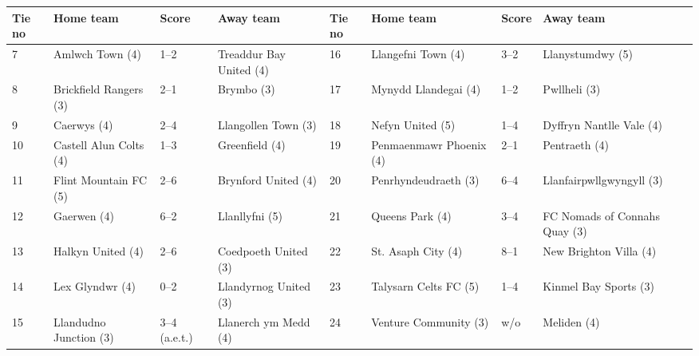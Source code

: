 \documentclass{article}
\begin{document}
\begin{tabular}{llllllll}
\toprule
Tie no & Home team & Score & Away team & Tie no & Home team & Score & Away team \\
\midrule
7 & Amlwch Town (4) & 1–2 & Treaddur Bay United (4) & 16 & Llangefni Town (4) & 3–2 & Llanystumdwy (5) \\
8 & Brickfield Rangers (3) & 2–1 & Brymbo (3) & 17 & Mynydd Llandegai (4) & 1–2 & Pwllheli (3) \\
9 & Caerwys (4) & 2–4 & Llangollen Town (3) & 18 & Nefyn United (5) & 1–4 & Dyffryn Nantlle Vale (4) \\
10 & Castell Alun Colts (4) & 1–3 & Greenfield (4) & 19 & Penmaenmawr Phoenix (4) & 2–1 & Pentraeth (4) \\
11 & Flint Mountain FC (5) & 2–6 & Brynford United (4) & 20 & Penrhyndeudraeth (3) & 6–4 & Llanfairpwllgwyngyll (3) \\
12 & Gaerwen (4) & 6–2 & Llanllyfni (5) & 21 & Queens Park (4) & 3–4 & FC Nomads of Connahs Quay (3) \\
13 & Halkyn United (4) & 2–6 & Coedpoeth United (3) & 22 & St. Asaph City (4) & 8–1 & New Brighton Villa (4) \\
14 & Lex Glyndwr (4) & 0–2 & Llandyrnog United (3) & 23 & Talysarn Celts FC (5) & 1–4 & Kinmel Bay Sports (3) \\
15 & Llandudno Junction (3) & 3–4 (a.e.t.) & Llanerch ym Medd (4) & 24 & Venture Community (3) & w/o & Meliden (4) \\
\bottomrule
\end{tabular}
\end{document}
